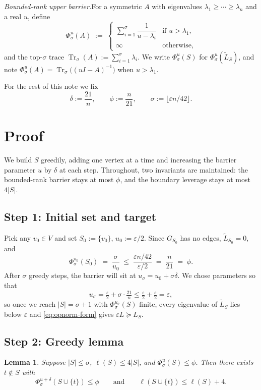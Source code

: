 \documentclass[11pt]{article}
\newcommand{\eps}{\varepsilon}
\newcommand{\Trs}{\operatorname{Tr}_{\sigma}}
\newcommand{\del}{\delta}
\newcommand{\tL}{\widetilde{L}}
\newtheorem{lemma}[theorem]{Lemma}
\begin{document}
\medskip
\noindent\emph{Bounded-rank upper barrier.}\quad For a symmetric $A$ with
eigenvalues $\lambda_1\ge\cdots\ge\lambda_n$ and a real $u$, define
\[
  \Phi^u_{\sigma}(A) \;:=\;
  \begin{cases}
    \displaystyle\sum_{i=1}^{\sigma}\dfrac{1}{u-\lambda_i} & \text{if } u>\lambda_1,\\[2pt]
    \infty & \text{otherwise,}
  \end{cases}
\]
and the top-$\sigma$ trace $\Trs(A):=\sum_{i=1}^{\sigma}\lambda_i$. We write
$\Phi^u_\sigma(S)$ for $\Phi^u_\sigma(\tL_S)$, and note
$\Phi^u_\sigma(A)=\Trs\bigl((uI-A)^{-1}\bigr)$ when $u>\lambda_1$.

For the rest of this note we fix
\[
  \del := \frac{21}{n}, \qquad
  \phi := \frac{n}{21}, \qquad
  \sigma := \lfloor \eps n/42 \rfloor.
\]

\section*{Proof}

We build $S$ greedily, adding one vertex at a time and increasing the barrier
parameter $u$ by $\del$ at each step. Throughout, two invariants are
maintained: the bounded-rank barrier stays at most $\phi$, and the boundary
leverage stays at most $4|S|$.

\subsection*{Step 1: Initial set and target}

Pick any $v_0\in V$ and set $S_0:=\{v_0\}$, $u_0:=\eps/2$. Since $G_{S_0}$ has
no edges, $\tL_{S_0}=0$, and
\[
  \Phi^{u_0}_\sigma(S_0) \;=\; \frac{\sigma}{u_0}
   \;\le\; \frac{\eps n/42}{\eps/2} \;=\; \frac{n}{21} \;=\; \phi.
\]
After $\sigma$ greedy steps, the barrier will sit at $u_\sigma=u_0+\sigma\del$.
We chose parameters so that
\[
  u_\sigma = \tfrac{\eps}{2} + \sigma\cdot\tfrac{21}{n}
           \le \tfrac{\eps}{2} + \tfrac{\eps}{2} = \eps,
\]
so once we reach $|S|=\sigma+1$ with $\Phi^{u_\sigma}_\sigma(S)$ finite, every
eigenvalue of $\tL_S$ lies below $\eps$ and \eqref{eq:opnorm-form} gives
$\eps L\succeq L_S$.

\subsection*{Step 2: Greedy lemma}

\begin{lemma}\label{lem:greedy}
Suppose $|S|\le\sigma$, $\ell(S)\le 4|S|$, and $\Phi^u_\sigma(S)\le\phi$. Then
there exists $t\notin S$ with
\[
  \Phi^{u+\del}_\sigma(S\cup\{t\})\le\phi
  \qquad\text{and}\qquad
  \ell(S\cup\{t\})\le\ell(S)+4.
\]
\end{lemma}
\end{document}
